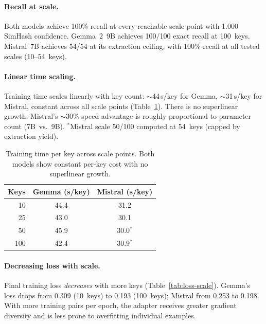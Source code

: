 \documentclass[11pt]{article}
\begin{document}
\paragraph{Recall at scale.}
Both models achieve 100\% recall at every reachable scale point with 1.000 SimHash confidence.
Gemma~2~9B achieves 100/100 exact recall at 100~keys.
Mistral~7B achieves 54/54 at its extraction ceiling, with 100\% recall at all tested scales (10--54~keys).

\paragraph{Linear time scaling.}
Training time scales linearly with key count: $\sim$44\,s/key for Gemma, $\sim$31\,s/key for Mistral, constant across all scale points (Table~\ref{tab:time-scaling}).
There is no superlinear growth.
Mistral's $\sim$30\% speed advantage is roughly proportional to parameter count (7B~vs.~9B).
$^*$Mistral scale 50/100 computed at 54~keys (capped by extraction yield).

\begin{table}[t]
\centering
\caption{Training time per key across scale points. Both models show constant per-key cost with no superlinear growth.}
\label{tab:time-scaling}
\small
\begin{tabular}{@{}rcc@{}}
\toprule
\textbf{Keys} & \textbf{Gemma (s/key)} & \textbf{Mistral (s/key)} \\
\midrule
10  & 44.4 & 31.2 \\
25  & 43.0 & 30.1 \\
50  & 45.9 & 30.0$^*$ \\
100 & 42.4 & 30.9$^*$ \\
\bottomrule
\end{tabular}
\end{table}

\paragraph{Decreasing loss with scale.}
Final training loss \emph{decreases} with more keys (Table~\ref{tab:loss-scale}).
Gemma's loss drops from 0.309 (10~keys) to 0.193 (100~keys); Mistral from 0.253 to 0.198.
With more training pairs per epoch, the adapter receives greater gradient diversity and is less prone to overfitting individual examples.
\end{document}
